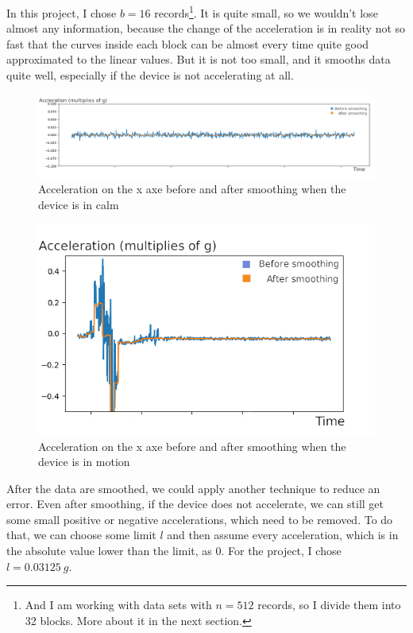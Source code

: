 \documentclass[hidelinks,a4paper]{article}
\begin{document}
In this project, I chose $b = 16$ records\footnote{And I am working with data sets with $n=512$ records, so I divide them into 32 blocks. More about it in the next section.}. It is quite small, so we wouldn't lose almost any information, because the change of the acceleration is in reality not so fast that the curves inside each block can be almost every time quite good approximated to the linear values. But it is not too small, and it smooths data quite well, especially if the device is not accelerating at all.\par
\begin{figure}[h]
    \includegraphics[width=15cm]{img/calmSmoothing.png}
    \caption{Acceleration on the x axe before and after smoothing when the device is in calm}
\end{figure}
\begin{figure}[h]
    \includegraphics[width=15cm]{img/motionSmoothing.png}
    \caption{Acceleration on the x axe before and after smoothing when the device is in motion}
\end{figure}
After the data are smoothed, we could apply another technique to reduce an error. Even after smoothing, if the device does not accelerate, we can still get some small positive or negative accelerations, which need to be removed. To do that, we can choose some limit $l$ and then assume every acceleration, which is in the absolute value lower than the limit, as 0. For the project, I chose $l = 0.03125~g$.
\end{document}
